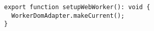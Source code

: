 \begin{verbatim}
export function setupWebWorker(): void {
  WorkerDomAdapter.makeCurrent();
}
\end{verbatim}
